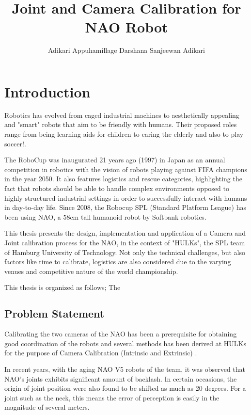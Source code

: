 \documentclass[english, printversion, nomenclature, notitle]{tuvisionthesis} %
\author{Adikari Appuhamillage Darshana Sanjeewan Adikari}
\title{Joint and Camera Calibration for NAO Robot}
\begin{document}
\hypersetup{
	pdfauthor=\@author\relax,
	pdftitle=\@title\relax
}
\tuvisionheading
\hypersetup{pageanchor=true}
\clearpage{\thispagestyle{empty}\cleardoublepage}

\chapter{Introduction}

Robotics has evolved from caged industrial machines to aesthetically appealing and "smart" robots that aim to be friendly with humans. Their proposed roles range from being learning aids for children to caring the elderly and also to play soccer!.

The RoboCup was inaugurated 21 years ago (1997) in Japan as an annual competition in robotics with the vision of robots playing against FIFA champions in the year 2050. It also features  logistics and rescue categories, highlighting  the fact that robots should be able to handle complex environments opposed to highly structured industrial settings in order to successfully interact with humans in day-to-day life.  Since 2008, the Robocup SPL (Standard Platform League) has been using NAO, a 58cm tall humanoid robot by Softbank robotics.

This thesis presents the design, implementation and application of a Camera and Joint calibration process for the NAO, in the context of "HULKs", the SPL team of Hamburg University of Technology. Not only the technical challenges, but also factors like time to calibrate, logistics are also considered due to the varying venues and competitive nature of the world championship.

This thesis is organized as follows; The 

\section{Problem Statement}

Calibrating the two cameras of the NAO has been a prerequisite for obtaining good coordination of the robots and several methods has been derived at HULKs for the purpose of Camera Calibration (Intrinsic and Extrinsic) \cite{HULKs2017Report}.

In recent years, with the aging NAO V5 robots of the team, it was observed that NAO's joints exhibits significant amount of backlash. In certain occasions, the origin of joint position were also found to be shifted as much as 20 degrees. For a joint such as the neck, this means the error of perception is easily in the magnitude of several meters.
\end{document}
